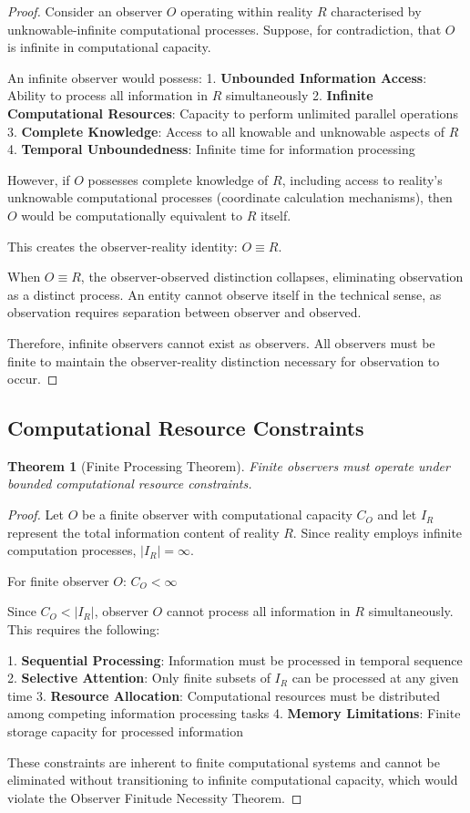 \documentclass[12pt,a4paper]{article}
\newtheorem{theorem}{Theorem}[section]
\begin{document}
\begin{proof}
Consider an observer $O$ operating within reality $R$ characterised by unknowable-infinite computational processes. Suppose, for contradiction, that $O$ is infinite in computational capacity.

An infinite observer would possess:
1. \textbf{Unbounded Information Access}: Ability to process all information in $R$ simultaneously
2. \textbf{Infinite Computational Resources}: Capacity to perform unlimited parallel operations
3. \textbf{Complete Knowledge}: Access to all knowable and unknowable aspects of $R$
4. \textbf{Temporal Unboundedness}: Infinite time for information processing

However, if $O$ possesses complete knowledge of $R$, including access to reality's unknowable computational processes (coordinate calculation mechanisms), then $O$ would be computationally equivalent to $R$ itself.

This creates the observer-reality identity: $O \equiv R$.

When $O \equiv R$, the observer-observed distinction collapses, eliminating observation as a distinct process. An entity cannot observe itself in the technical sense, as observation requires separation between observer and observed.

Therefore, infinite observers cannot exist as observers. All observers must be finite to maintain the observer-reality distinction necessary for observation to occur.
\end{proof}

\subsection{Computational Resource Constraints}

\begin{theorem}[Finite Processing Theorem]
Finite observers must operate under bounded computational resource constraints.
\end{theorem}

\begin{proof}
Let $O$ be a finite observer with computational capacity $C_O$ and let $I_R$ represent the total information content of reality $R$. Since reality employs infinite computation processes, $|I_R| = \infty$.

For finite observer $O$: $C_O < \infty$

Since $C_O < |I_R|$, observer $O$ cannot process all information in $R$ simultaneously. This requires the following:

1. \textbf{Sequential Processing}: Information must be processed in temporal sequence
2. \textbf{Selective Attention}: Only finite subsets of $I_R$ can be processed at any given time
3. \textbf{Resource Allocation}: Computational resources must be distributed among competing information processing tasks
4. \textbf{Memory Limitations}: Finite storage capacity for processed information

These constraints are inherent to finite computational systems and cannot be eliminated without transitioning to infinite computational capacity, which would violate the Observer Finitude Necessity Theorem.
\end{proof}
\end{document}
